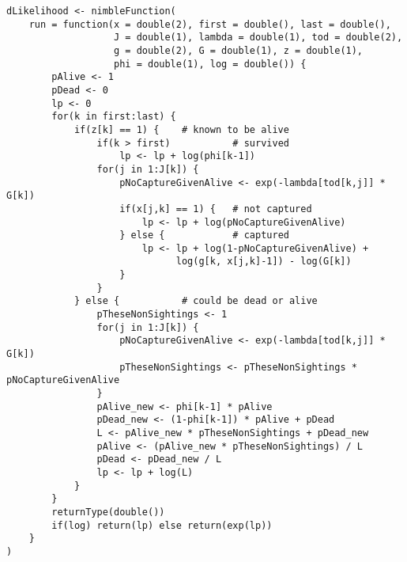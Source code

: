 \begin{singlespace}
\begin{small}
\begin{verbatim}
dLikelihood <- nimbleFunction(
    run = function(x = double(2), first = double(), last = double(), 
                   J = double(1), lambda = double(1), tod = double(2),
                   g = double(2), G = double(1), z = double(1), 
                   phi = double(1), log = double()) {
        pAlive <- 1
        pDead <- 0
        lp <- 0
        for(k in first:last) {
            if(z[k] == 1) {    # known to be alive
                if(k > first)           # survived
                    lp <- lp + log(phi[k-1])
                for(j in 1:J[k]) {
                    pNoCaptureGivenAlive <- exp(-lambda[tod[k,j]] * G[k])
                    if(x[j,k] == 1) {   # not captured
                        lp <- lp + log(pNoCaptureGivenAlive)
                    } else {            # captured
                        lp <- lp + log(1-pNoCaptureGivenAlive) + 
                              log(g[k, x[j,k]-1]) - log(G[k])
                    }
                }
            } else {           # could be dead or alive
                pTheseNonSightings <- 1
                for(j in 1:J[k]) {
                    pNoCaptureGivenAlive <- exp(-lambda[tod[k,j]] * G[k])
                    pTheseNonSightings <- pTheseNonSightings * pNoCaptureGivenAlive
                }
                pAlive_new <- phi[k-1] * pAlive
                pDead_new <- (1-phi[k-1]) * pAlive + pDead
                L <- pAlive_new * pTheseNonSightings + pDead_new
                pAlive <- (pAlive_new * pTheseNonSightings) / L
                pDead <- pDead_new / L
                lp <- lp + log(L)
            }
        }
        returnType(double())
        if(log) return(lp) else return(exp(lp))
    }
)


\end{verbatim}
\end{small}
\end{singlespace}
